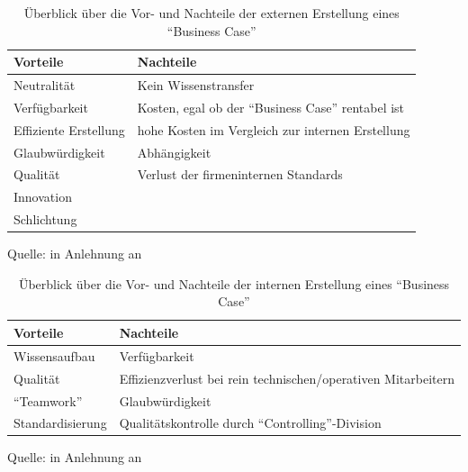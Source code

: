 \begin{table}[h!]
	\centering
	
	\begin{tabular}{@{}ll@{}}\toprule[1.5pt]
		
		\textbf{Vorteile} & \textbf{Nachteile} \\ \midrule
		
		Neutralität & Kein Wissenstransfer \\
		Verfügbarkeit & Kosten, egal ob der \enquote{Business Case} rentabel ist\\
		Effiziente Erstellung & hohe Kosten im Vergleich zur internen Erstellung \\
		Glaubwürdigkeit & Abhängigkeit \\
		Qualität & Verlust der firmeninternen Standards \\
		Innovation & \\
		Schlichtung & \\
		
		\bottomrule[1.5pt]
	\end{tabular}
	
	\caption{Überblick über die Vor- und Nachteile der externen Erstellung eines \enquote{Business Case}}
	{\footnotesize Quelle: in Anlehnung an \cite[][S.\,34]{brugger_it_2009}}
	\label{tab:externVorNachteile}
	
\end{table}

\begin{table}[h!]
	\centering
	
	\begin{tabular}{@{}ll@{}}\toprule[1.5pt]
		
		\textbf{Vorteile} & \textbf{Nachteile} \\ \midrule
		
		Wissensaufbau & Verfügbarkeit \\
		Qualität & Effizienzverlust bei rein technischen/operativen Mitarbeitern \\
		\enquote{Teamwork} & Glaubwürdigkeit \\
		Standardisierung & Qualitätskontrolle durch \enquote{Controlling}-Division \\
		
		\bottomrule[1.5pt]
	\end{tabular}
	
	\caption{Überblick über die Vor- und Nachteile der internen Erstellung eines \enquote{Business Case}}
	{\footnotesize Quelle: in Anlehnung an \cite[][S.\,34]{brugger_it_2009}}
	\label{tab:internVorNachteile}
	
\end{table}

